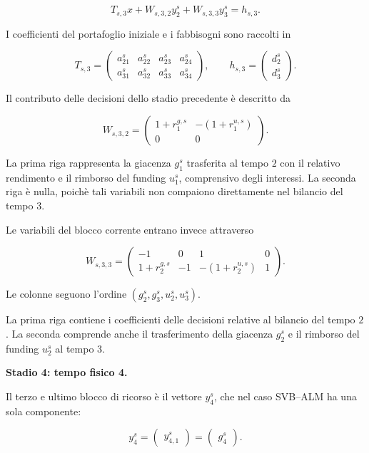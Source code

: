 \[
T_{s,3}x+
W_{s,3,2}y_2^s+
W_{s,3,3}y_3^s
=
h_{s,3}.
\]

I coefficienti del portafoglio iniziale
e i fabbisogni sono raccolti in

\[
T_{s,3}
=
\begin{pmatrix}
a_{21}^s&a_{22}^s&a_{23}^s&a_{24}^s\\
a_{31}^s&a_{32}^s&a_{33}^s&a_{34}^s
\end{pmatrix},
\qquad
h_{s,3}
=
\begin{pmatrix}
d_2^s\\
d_3^s
\end{pmatrix}.
\]

Il contributo delle decisioni
dello stadio precedente \`e descritto da

\[
W_{s,3,2}
=
\begin{pmatrix}
1+r_1^{g,s}&-(1+r_1^{u,s})\\
0&0
\end{pmatrix}.
\]

La prima riga rappresenta la giacenza
$g_1^s$ trasferita al tempo $2$
con il relativo rendimento e il rimborso
del funding $u_1^s$, comprensivo
degli interessi. La seconda riga
\`e nulla, poich\`e tali variabili
non compaiono direttamente nel bilancio
del tempo $3$.

Le variabili del blocco corrente
entrano invece attraverso

\[
W_{s,3,3}
=
\begin{pmatrix}
-1&0&1&0\\
1+r_2^{g,s}&-1&-(1+r_2^{u,s})&1
\end{pmatrix}.
\]

Le colonne seguono l'ordine
$(g_2^s,g_3^s,u_2^s,u_3^s)$.

La prima riga contiene i coefficienti
delle decisioni relative al bilancio
del tempo $2$.
La seconda comprende anche
il trasferimento della giacenza $g_2^s$
e il rimborso del funding $u_2^s$
al tempo $3$.

\medskip

\medskip

\noindent
\textbf{Stadio 4: tempo fisico 4.}

Il terzo e ultimo blocco di ricorso \`e
il vettore $y_4^s$, che nel caso SVB--ALM
ha una sola componente:

\[
y_4^s
=
\begin{pmatrix}
y_{4,1}^s
\end{pmatrix}
=
\begin{pmatrix}
g_4^s
\end{pmatrix}.
\]

